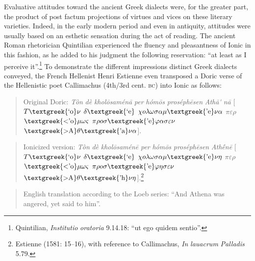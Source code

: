 Evaluative attitudes toward the ancient Greek dialects were, for the greater part, the product of post factum projections of virtues and vices on these literary varieties. Indeed, in the early modern period and even in antiquity, attitudes were usually based on an esthetic sensation during the act of reading. The ancient Roman rhetorician Quintilian experienced the fluency and pleasantness of Ionic in this fashion, as he added to his judgment the following reservation: “at least as I perceive it”.\footnote{Quintilian, \textit{Institutio} \textit{oratoria} 9.14.18: “ut ego quidem sentio”.} To demonstrate the different impressions distinct Greek dialects conveyed, the French Hellenist Henri Estienne even transposed a Doric verse of the Hellenistic poet Callimachus (4th/3rd cent. \textsc{bc}) into Ionic as follows:

\begin{quote}
Original Doric: \textit{Tòn} \textit{dè} \textit{kholōsaménā} \textit{per} \textit{hómōs} \textit{proséphēsen} \textit{Athā\'{} nā} [$T\text{\textgreek{`o}}\nu $ $\delta \text{\textgreek{`e}}$ $\chi o\lambda \omega \sigma \alpha \mu \text{\textgreek{'e}}\nu \alpha $ $\pi \varepsilon \rho $ $\text{\textgreek{<'o}}\mu \omega \varsigma $ $\pi \rho o\sigma \text{\textgreek{'e}}\varphi \alpha \sigma \varepsilon \nu $ $\text{\textgreek{>A}}\theta \text{\textgreek{'a}}\nu \alpha $].
\end{quote}

\begin{quote}
Ionicized version: \textit{Tòn} \textit{dè} \textit{kholōsaménē} \textit{per} \textit{hómōs} \textit{proséphēsen} \textit{Athḗnē} [$T\text{\textgreek{`o}}\nu $ $\delta \text{\textgreek{`e}}$ $\chi o\lambda \omega \sigma \alpha \mu \text{\textgreek{'e}}\nu \eta $ $\pi \varepsilon \rho $ $\text{\textgreek{<'o}}\mu \omega \varsigma $ $\pi \rho o\sigma \text{\textgreek{'e}}\varphi \eta \sigma \varepsilon \nu $ $\text{\textgreek{>A}}\theta \text{\textgreek{'h}}\nu \eta $].\footnote{Estienne (1581: 15–16), with reference to Callimachus, \textit{In} \textit{lauacrum} \textit{Palladis} 5.79.}
\end{quote}

\begin{quote}
English translation according to the Loeb series: “And Athena was angered, yet said to him”.
\end{quote}

